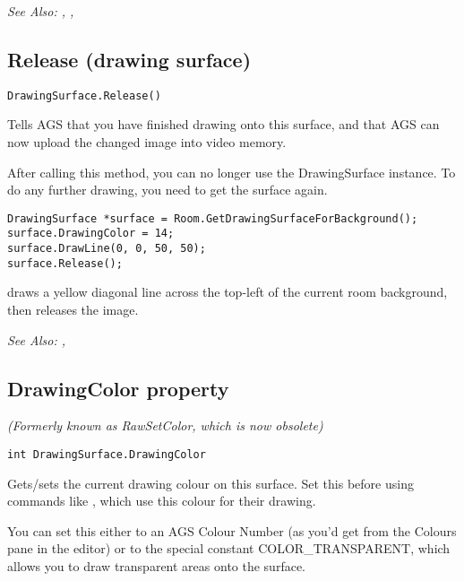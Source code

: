 \it{See Also:} ,
 ,


\subsection{Release (drawing surface)}\label{DrawingSurface.Release}%

\begin{verbatim}
DrawingSurface.Release()
\end{verbatim}
Tells AGS that you have finished drawing onto this surface, and that AGS can now upload
the changed image into video memory.

After calling this method, you can no longer use the DrawingSurface instance. To do
any further drawing, you need to get the surface again.

\begin{verbatim}
DrawingSurface *surface = Room.GetDrawingSurfaceForBackground();
surface.DrawingColor = 14;
surface.DrawLine(0, 0, 50, 50);
surface.Release();
\end{verbatim}
draws a yellow diagonal line across the top-left of the current room background,
then releases the image.

\it{See Also:} ,


\subsection{DrawingColor property}\label{DrawingSurface.DrawingColor}%

\it{(Formerly known as RawSetColor, which is now obsolete)}

\begin{verbatim}
int DrawingSurface.DrawingColor
\end{verbatim}
Gets/sets the current drawing colour on this surface. Set this before using commands
like , which use this colour for
their drawing.

You can set this either to an AGS Colour Number (as you'd get from the Colours pane
in the editor) or to the special constant COLOR_TRANSPARENT, which allows you
to draw transparent areas onto the surface.

